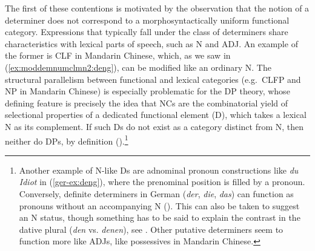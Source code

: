 \documentclass[output=paper,colorlinks,citecolor=brown]{langscibook}
\begin{document}
The first of these contentions is motivated by the observation that the notion of a determiner does not correspond to a morphosyntactically uniform functional category. Expressions that typically fall under the class of determiners share characteristics with lexical parts of speech, such as N and ADJ.  An example of the former  is CLF in Mandarin Chinese, which, as we saw in (\ref{ex:moddemnumclmn2:deng}), 
can be modified like an ordinary N. The structural parallelism between functional and lexical categories (e.g.\ CLFP and NP in Mandarin Chinese) is especially problematic for the  DP theory, whose defining feature is precisely the idea that NCs are the combinatorial yield of selectional properties of a dedicated functional element (D), which takes a lexical N as its complement. If such Ds do not exist as a category distinct from N, then neither do DPs, by definition (\citealt[157]{VanEynde06a}).\footnote{Another example of N-like Ds are adnominal pronoun constructions like \textit{du Idiot} in (\ref{ger-ex:deng}), where the prenominal position is filled by a pronoun. Conversely, definite determiners in German (\textit{der}, \textit{die}, \textit{das}) can function as pronouns without an accompanying N (\citealt{Postal69a, Wiltschko98a}). This can also be taken to suggest an N status, though something has to be said to explain the contrast in the dative plural (\textit{den} vs. \textit{denen}), see \citet[155]{Wiltschko98a}. %
Other putative determiners seem to function more like ADJs, like possessives in Mandarin Chinese. %
}
\end{document}
